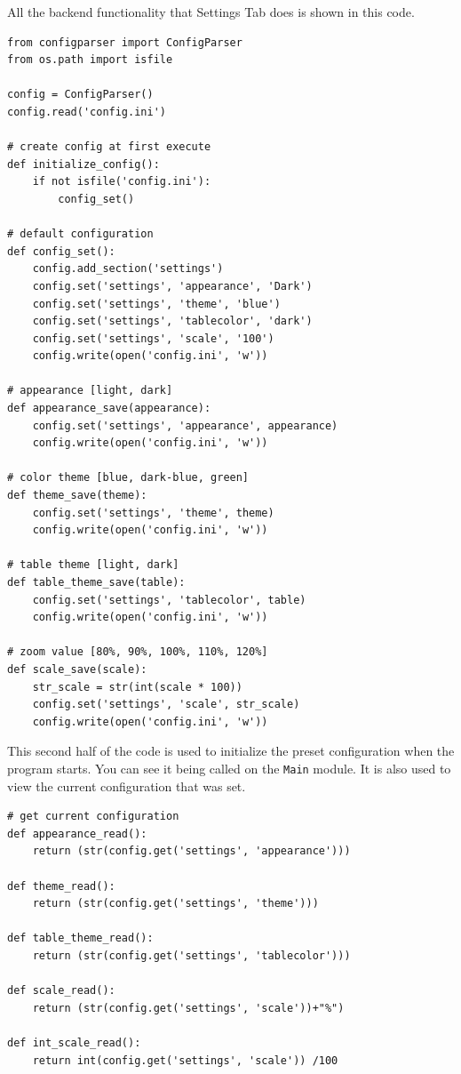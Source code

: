 \documentclass[12pt,a4paper]{article}
\begin{document}
            All the backend functionality that Settings Tab does is shown in this code. 
            \begin{lstlisting}
from configparser import ConfigParser
from os.path import isfile

config = ConfigParser()
config.read('config.ini')

# create config at first execute
def initialize_config():
    if not isfile('config.ini'):
        config_set()

# default configuration
def config_set():
    config.add_section('settings')
    config.set('settings', 'appearance', 'Dark')
    config.set('settings', 'theme', 'blue')
    config.set('settings', 'tablecolor', 'dark')
    config.set('settings', 'scale', '100')
    config.write(open('config.ini', 'w'))

# appearance [light, dark]
def appearance_save(appearance):
    config.set('settings', 'appearance', appearance)
    config.write(open('config.ini', 'w'))

# color theme [blue, dark-blue, green]
def theme_save(theme):
    config.set('settings', 'theme', theme)
    config.write(open('config.ini', 'w'))

# table theme [light, dark]
def table_theme_save(table):
    config.set('settings', 'tablecolor', table)
    config.write(open('config.ini', 'w'))

# zoom value [80%, 90%, 100%, 110%, 120%]
def scale_save(scale):
    str_scale = str(int(scale * 100))
    config.set('settings', 'scale', str_scale)
    config.write(open('config.ini', 'w'))
            \end{lstlisting}

            This second half of the code is used to initialize the preset configuration 
            when the program starts. You can see it being called on the \texttt{Main} 
            module. It is also used to view the current configuration that was set.
            \begin{lstlisting}
# get current configuration
def appearance_read():
    return (str(config.get('settings', 'appearance')))

def theme_read():
    return (str(config.get('settings', 'theme')))

def table_theme_read():
    return (str(config.get('settings', 'tablecolor')))

def scale_read():
    return (str(config.get('settings', 'scale'))+"%")

def int_scale_read():
    return int(config.get('settings', 'scale')) /100
            \end{lstlisting}
\end{document}
